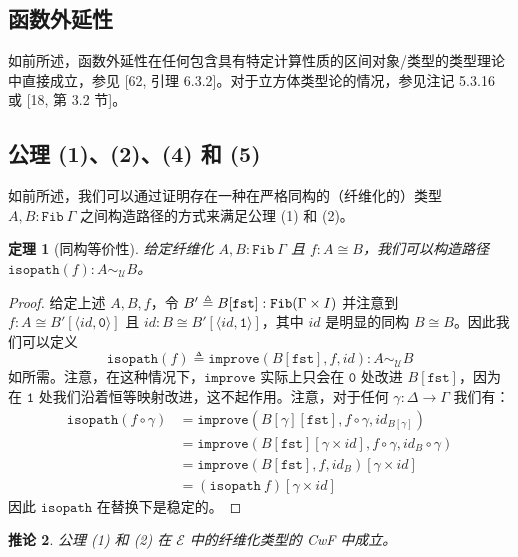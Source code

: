 \documentclass{ctexrep}
\let\mathbb\relax %
\theoremstyle{plain}
\newtheorem{theorem}{定理}[section]
\newtheorem{corollary}[theorem]{推论}
\theoremstyle{definition}
\theoremstyle{remark}
\begin{document}
\subsection{函数外延性}

如前所述，函数外延性在任何包含具有特定计算性质的区间对象/类型的类型理论中直接成立，参见 [62, 引理 6.3.2]。对于立方体类型论的情况，参见注记 5.3.16 或 [18, 第 3.2 节]。

\subsection{公理 (1)、(2)、(4) 和 (5)}

如前所述，我们可以通过证明存在一种在严格同构的（纤维化的）类型 $A, B : \mathtt{Fib}\ \Gamma$ 之间构造路径的方式来满足公理 (1) 和 (2)。

\begin{theorem}[同构等价性]
给定纤维化 $A, B : \mathtt{Fib}\ \Gamma$ 且 $f : A \cong B$，我们可以构造路径 $\mathtt{isopath}(f) : A \sim_{\mathcal{U}} B$。
\end{theorem}

\begin{proof}
给定上述 $A, B, f$，令 $B' \triangleq B[\mathtt{fst}] : \mathtt{Fib}(\Gamma \times \mathbb{I})$ 并注意到 $f : A \cong B'[\langle  id , \mathtt{0} \rangle]$ 且 $ id  : B \cong B'[\langle  id , \mathtt{1} \rangle]$，其中 $ id $ 是明显的同构 $B \cong B$。因此我们可以定义
$$\mathtt{isopath}(f) \triangleq \mathtt{improve}(B[\mathtt{fst}], f,  id ) : A \sim_{\mathcal{U}} B$$
如所需。注意，在这种情况下，$\mathtt{improve}$ 实际上只会在 $\mathtt{0}$ 处改进 $B[\mathtt{fst}]$，因为在 $\mathtt{1}$ 处我们沿着恒等映射改进，这不起作用。注意，对于任何 $\gamma : \Delta \to \Gamma$ 我们有：
\begin{align*}
\mathtt{isopath}(f \circ \gamma) &= \mathtt{improve}(B[\gamma][\mathtt{fst}], f \circ \gamma,  id _{B[\gamma]}) \\
&= \mathtt{improve}(B[\mathtt{fst}][\gamma \times  id ], f \circ \gamma,  id _B \circ \gamma) \\
&= \mathtt{improve}(B[\mathtt{fst}], f,  id _B)[\gamma \times  id ] \\
&= (\mathtt{isopath}\ f)[\gamma \times  id ]
\end{align*}
因此 $\mathtt{isopath}$ 在替换下是稳定的。
\end{proof}

\begin{corollary}
公理 (1) 和 (2) 在 $\mathcal{E}$ 中的纤维化类型的 CwF 中成立。
\end{corollary}
\end{document}

